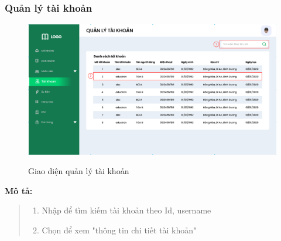     \subsubsection{Quản lý tài khoản}
        \begin{figure}[!htp]
            \centering
            \includegraphics[width=12cm]{img/UI/admin/account.png}
            \label{29}
            \newline
            \caption{Giao diện quản lý tài khoản}
        \end{figure}
        \textbf{Mô tả:}  
        \begin{quote}
            \begin{enumerate}
                \item Nhập để tìm kiếm tài khoản theo Id, username
                \item Chọn để xem "thông tin chi tiết tài khoản"
            \end{enumerate}
        \end{quote}

